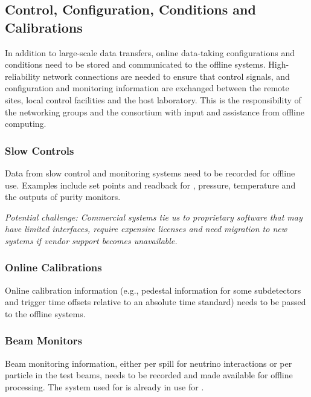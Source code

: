 \documentclass[../main-v1.tex]{subfiles}
\begin{document}
\subsection{Control, Configuration, Conditions and Calibrations}
In addition to large-scale data transfers, online data-taking configurations and conditions need to be stored and communicated to the offline systems. High-reliability network connections are needed to ensure that control signals, and configuration and monitoring information are exchanged between the remote sites, local control facilities and the host laboratory.
This is the responsibility of the  networking groups and the  consortium with input and assistance from offline computing. 


\subsubsection{Slow Controls}
Data from slow control and monitoring systems need to be recorded for offline use.  Examples include set points and readback for , %
pressure, temperature and the outputs of purity monitors. 

{\it Potential challenge: Commercial  systems tie us to proprietary software that may have limited interfaces, require expensive licenses and need migration to new systems if %
vendor support becomes unavailable.}

\subsubsection{Online Calibrations}
Online calibration information (e.g., pedestal information for some subdetectors and trigger time offsets relative to an absolute time standard) needs to be passed to the offline systems. 


\subsubsection{Beam Monitors}
Beam monitoring information, either per spill for neutrino interactions or per particle in the  test beams, needs to be recorded and made available for offline processing. 
The  system used for  is already in use for .
\end{document}
